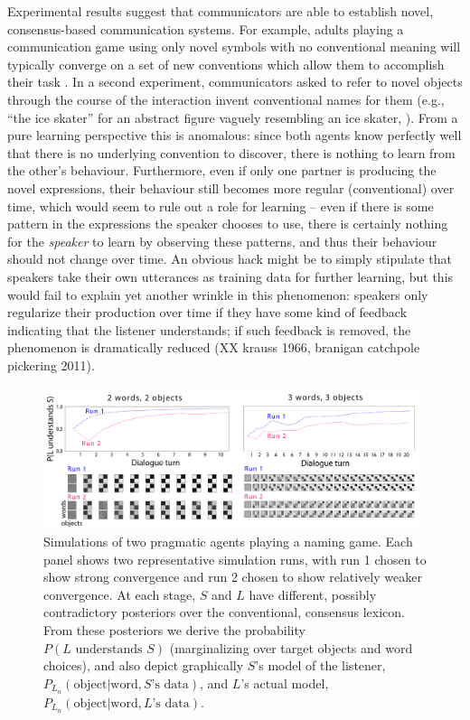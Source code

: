 \documentclass{article} %
\newcommand{\word}{\text{word}}
\newcommand{\obj}{\text{object}}
\begin{document}
Experimental results suggest that communicators are able to establish novel, consensus-based communication systems. For example, adults playing a communication game using only novel symbols with no conventional meaning will typically converge on a set of new conventions which allow them to accomplish their task \cite{galantucci2005}. In a second experiment, communicators asked to refer to novel objects through the course of the interaction invent conventional names for them (e.g., ``the ice skater'' for an abstract figure vaguely resembling an ice skater, \cite{clark1986}). From a pure learning perspective this is anomalous: since both agents know perfectly well that there is no underlying convention to discover, there is nothing to learn from the other's behaviour. Furthermore, even if only one partner is producing the novel expressions, their behaviour still becomes more regular (conventional) over time, which would seem to rule out a role for learning -- even if there is some pattern in the expressions the speaker chooses to use, there is certainly nothing for the \textit{speaker} to learn by observing these patterns, and thus their behaviour should not change over time. An obvious hack might be to simply stipulate that speakers take their own utterances as training data for further learning, but this would fail to explain yet another wrinkle in this phenomenon: speakers only regularize their production over time if they have some kind of feedback indicating that the listener understands; if such feedback is removed, the phenomenon is dramatically reduced (XX krauss 1966, branigan catchpole pickering 2011).

\begin{figure}[t]
\centering
\includegraphics[width=0.98\textwidth]{figures/emergence-composite.pdf}
\caption{\label{fig:emergence} Simulations of two pragmatic agents playing a naming game. Each panel shows two representative simulation runs, with run 1 chosen to show strong convergence and run 2 chosen to show relatively weaker convergence. At each stage, $S$ and $L$ have different, possibly contradictory posteriors over the conventional, consensus lexicon. From these posteriors we derive the probability $P(\text{$L$ understands $S$})$ (marginalizing over target objects and word choices), and also depict graphically $S$'s model of the listener, $P_{L_n}(\obj | \word, \text{$S$'s data})$, and $L$'s actual model, $P_{L_n}(\obj | \word, \text{$L$'s data})$. }
\end{figure}
\end{document}
